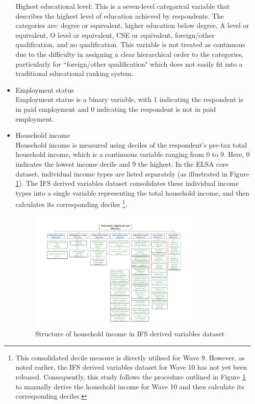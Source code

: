 \begin{itemize}[wide=0pt, leftmargin=*, labelwidth=0pt, labelindent=\parindent, itemindent=0pt]
    Highest educational level: This is a seven-level categorical variable that describes the highest level of education achieved by respondents. The categories are: degree or equivalent, higher education below degree, A level or equivalent, O level or equivalent, CSE or equivalent, foreign/other qualification, and no qualification. This variable is not treated as continuous due to the difficulty in assigning a clear hierarchical order to the categories, particularly for ``foreign/other qualification" which does not easily fit into a traditional educational ranking system.
    \item Employment status \\
    Employment status is a binary variable, with 1 indicating the respondent is in paid employment and 0 indicating the respondent is not in paid employment. 
    \item Household income \\
    Household income is measured using deciles of the respondent's pre-tax total household income, which is a continuous variable ranging from 0 to 9. Here, 0 indicates the lowest income decile and 9 the highest. In the ELSA core dataset, individual income types are listed separately (as illustrated in Figure \ref{fig:household_income}). The IFS derived variables dataset consolidates these individual income types into a single variable representing the total household income, and then calculates its corresponding deciles \footnote{This consolidated decile measure is directly utilised for Wave 9. However, as noted earlier, the IFS derived variables dataset for Wave 10 has not yet been released. Consequently, this study follows the procedure outlined in Figure \ref{fig:household_income} to manually derive the household income for Wave 10 and then calculate its corresponding deciles.}. 

    \begin{figure}
        \centering
        \caption{Structure of household income in IFS derived variables dataset}
        \label{fig:household_income}
        \includegraphics[width=0.8\textwidth]{figures/household_income.jpg}
    \end{figure}


\end{itemize}

